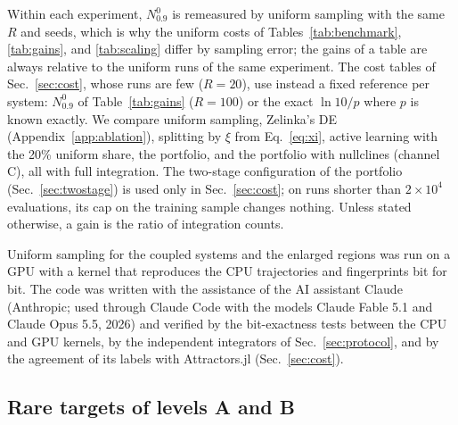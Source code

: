 Within each experiment, $N^0_{0.9}$ is remeasured by uniform sampling with the same $R$ and seeds, which is why the uniform costs of Tables~\ref{tab:benchmark}, \ref{tab:gains}, and \ref{tab:scaling} differ by sampling error; the gains of a table are always relative to the uniform runs of the same experiment. The cost tables of Sec.~\ref{sec:cost}, whose runs are few ($R=20$), use instead a fixed reference per system: $N^0_{0.9}$ of Table~\ref{tab:gains} ($R=100$) or the exact $\ln10/p$ where $p$ is known exactly. We compare uniform sampling, Zelinka's DE (Appendix~\ref{app:ablation}), splitting by $\xi$ from Eq.~\eqref{eq:xi}, active learning with the 20\% uniform share, the portfolio, and the portfolio with nullclines (channel C), all with full integration. The two-stage configuration of the portfolio (Sec.~\ref{sec:twostage}) is used only in Sec.~\ref{sec:cost}; on runs shorter than $2\times10^4$ evaluations, its cap on the training sample changes nothing. Unless stated otherwise, a gain is the ratio of integration counts.

Uniform sampling for the coupled systems and the enlarged regions was run on a GPU with a kernel that reproduces the CPU trajectories and fingerprints bit for bit. The code was written with the assistance of the AI assistant Claude (Anthropic; used through Claude Code with the models Claude Fable 5.1 and Claude Opus 5.5, 2026) and verified by the bit-exactness tests between the CPU and GPU kernels, by the independent integrators of Sec.~\ref{sec:protocol}, and by the agreement of its labels with Attractors.jl (Sec.~\ref{sec:cost}).

\subsection{Rare targets of levels A and B}\label{sec:rare_ab}

